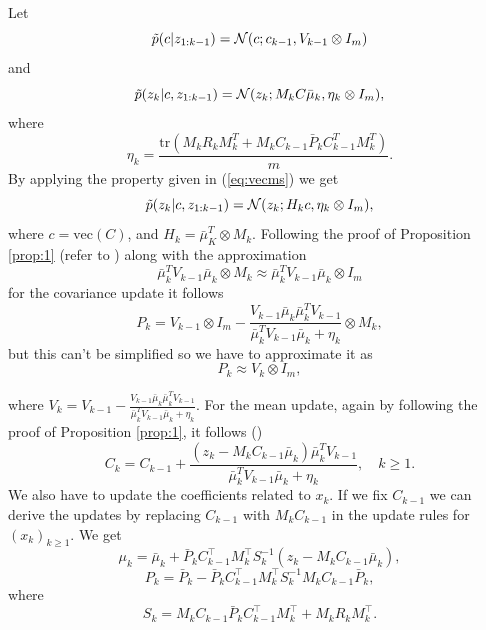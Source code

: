 \documentclass{mldsmsc}
\begin{document}
Let
\begin{equation}
    \Tilde{p}(c | z_{1:k-1}) = \mathcal{N}(c; c_{k-1}, V_{k-1} \otimes I_m)
\end{equation}
and 
\begin{equation}
    \Tilde{p}(z_k | c, z_{1:k-1}) = \mathcal{N}(z_k; M_k C \bar{\mu}_k, \eta_k \otimes I_m), 
\end{equation}
where 
\begin{equation}
    \eta_k = \frac{\text{tr}(M_k R_k M_k^T + M_k C_{k-1} \bar{P}_k C_{k-1}^T M_k^T)}{m}.
\end{equation}
By applying the property given in (\ref{eq:vecms}) we get
\begin{equation}
    \Tilde{p}(z_k | c, z_{1:k-1}) = \mathcal{N}(z_k; H_k c, \eta_k \otimes I_m),
\end{equation}
where $c = \text{vec}(C)$, and $H_k = \bar{\mu}_K^T \otimes M_k$. Following the proof of Proposition \ref{prop:1} (refer to \cite{akyildiz2021probabilistic}) along with the approximation
\begin{equation}
    \bar{\mu}_k^T V_{k-1} \bar{\mu}_k \otimes M_k \approx \bar{\mu}_k^T V_{k-1} \bar{\mu}_k \otimes I_m
\end{equation}
for the covariance update it follows
\begin{equation}
    P_k = V_{k-1} \otimes I_m - \frac{V_{k-1} \bar{\mu}_k \bar{\mu}_k^T V_{k-1}}{\bar{\mu}_k^T V_{k-1} \bar{\mu}_k + \eta_k} \otimes M_k,
\end{equation}
but this can't be simplified so we have to approximate it as
\begin{equation}
    P_k \approx V_k \otimes I_m,
\end{equation}

\noindent where $V_k = V_{k-1} - \frac{V_{k-1} \bar{\mu}_k \bar{\mu}^T_k V_{k-1}}{\bar{\mu}_k^T V_{k-1} \bar{\mu}_k + \eta_k}$. \newline
For the mean update, again by following the proof of Proposition \ref{prop:1}, it follows (\cite{akyildiz2021probabilistic})
\begin{equation}
    C_k = C_{k-1} + \frac{\left( z_k - M_k C_{k-1} \bar{\mu}_k \right) \bar{\mu}_k^T V_{k-1}}{\bar{\mu}_k^T V_{k-1} \bar{\mu}_k + \eta_k}, \quad k \geq 1.
\end{equation}
We also have to update the coefficients related to $x_k$. If we fix \(C_{k-1}\) we can derive the updates by replacing \(C_{k-1}\) with \(M_k C_{k-1}\) in the update rules for \((x_k)_{k \geq 1}\). We get
\begin{equation}
    \mu_k = \bar{\mu}_k + \bar{P}_k C_{k-1}^\top M_k^\top S_k^{-1} (z_k - M_k C_{k-1} \bar{\mu}_k),
\end{equation}
\begin{equation}
    P_k = \bar{P}_k - \bar{P}_k C_{k-1}^\top M_k^\top S_k^{-1} M_k C_{k-1} \bar{P}_k,
\end{equation}
where 
\begin{equation}
    S_k = M_k C_{k-1} \bar{P}_k C_{k-1}^\top M_k^\top + M_k R_k M_k^\top.
\end{equation}
\end{document}
